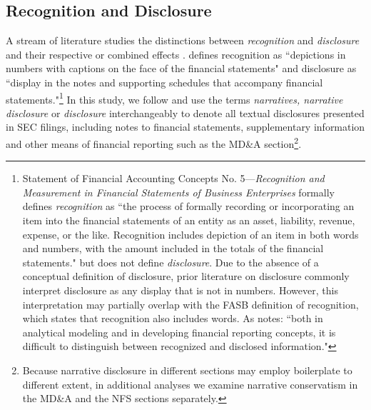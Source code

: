 \documentclass[letterpaper,11pt]{article}
\begin{document}
\begin{spacing}{1.5}
\subsection{Recognition and Disclosure}\label{sec2.1}
A stream of literature studies the distinctions between \textit{recognition} and \textit{disclosure} and their respective or combined effects \cite{aboodyRecognitionDisclosureOil1996, barthMarketEffectsRecognition2003, schipperRequiredDisclosuresFinancial2007}.  defines recognition as ``depictions in numbers with captions on the face of the financial statements" and disclosure as ``display in the notes and supporting schedules that accompany financial statements."\footnote{Statement of Financial Accounting Concepts No. 5---\textit{Recognition and Measurement in Financial Statements of Business Enterprises} formally defines \textit{recognition} as ``the process of formally recording or incorporating an item into the financial statements of an entity as an asset, liability, revenue, expense, or the like. Recognition includes depiction of an item in both words and numbers, with the amount included in the totals of the financial statements."  but does not define \textit{disclosure}. Due to the absence of a conceptual definition of disclosure, prior literature on disclosure commonly interpret disclosure as any display that is not in numbers. However, this interpretation may partially overlap with the FASB definition of recognition, which states that recognition also includes words. As  notes: ``both in analytical modeling and in developing financial reporting concepts, it is difficult to distinguish between recognized and disclosed information."} In this study, we follow  and use the terms \textit{narratives, narrative disclosure} or \textit{disclosure} interchangeably to denote all textual disclosures presented in SEC filings, including notes to financial statements, supplementary information and other means of financial reporting such as the MD\&A section\footnote{Because narrative disclosure in different sections may employ boilerplate to different extent, in additional analyses we examine narrative conservatism in the MD\&A and the NFS sections separately.}. 


\end{spacing}
\end{document}
